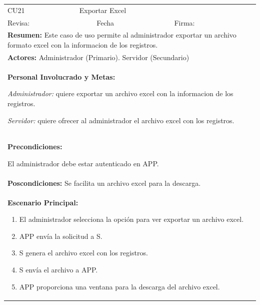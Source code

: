 \begin{longtable}{|l|p{5.5cm}|l|p{2cm}|l|p{1.9cm}|} \hline
    \cellcolor{grisOscuro} CU21 & \multicolumn{4}{|l|}{  \cellcolor{grisOscuro} Exportar Excel} &  \cellcolor{grisClaro}\multirow{2}{1cm}{} \\ \cline{1-5}
    \cellcolor{grisOscuro} Revisa: &  \cellcolor{grisClaro} &  \cellcolor{grisOscuro} Fecha &  \cellcolor{grisClaro} &  \cellcolor{grisOscuro} Firma: & \cellcolor{grisClaro} \\ \hline
    \multicolumn{6}{|p{15cm}|}{ \textbf{Resumen: } Este caso de uso permite al administrador exportar un archivo formato excel con la informacion de los registros.

    } \\ \hline

    \multicolumn{6}{|p{15cm}|}{ \textbf{Actores: } Administrador (Primario). Servidor (Secundario)

    } \\ \hline

    \multicolumn{6}{|p{15cm}|}{ \textbf{Personal Involucrado y Metas: }
    
    \emph{Administrador:} quiere exportar un archivo excel con la informacion de los registros.

    \emph{Servidor:} quiere ofrecer al administrador el archivo excel con los registros.
    } \\ \hline

    \multicolumn{6}{|p{15cm}|}{ \textbf{Precondiciones: } 
    
    El administrador debe estar autenticado en APP.

    } \\ \hline

    \multicolumn{6}{|p{15cm}|}{ \textbf{Poscondiciones: } Se facilita un archivo excel para la descarga.

    } \\ \hline

    \multicolumn{6}{|p{15cm}|}{ \textbf{Escenario Principal: }

    \begin{enumerate}
        \item El administrador selecciona la opción para ver exportar un archivo excel.
        \item APP envía la solicitud a S.
        \item S genera el archivo excel con los registros.
        \item S envía el archivo a APP.
        \item APP proporciona una ventana para la descarga del archivo excel.
    \end{enumerate}

}
\end{longtable}
